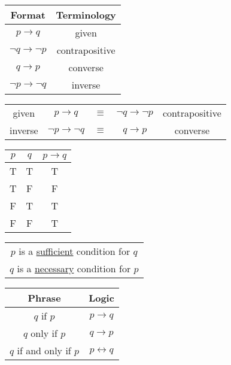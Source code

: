 \begin{center}
  \begin{tabular}{c|c}
    Format                          & Terminology    \\
    \hline
    \(p \rightarrow q\)             & given          \\
    \(\lnot q \rightarrow \lnot p\) & contrapositive \\
    \(q \rightarrow p\)             & converse       \\
    \(\lnot p \rightarrow \lnot q\) & inverse        \\
  \end{tabular}
  \qquad
  \begin{tabular}{ccccc}
    given   & \(p \rightarrow q\)             & \(\equiv\) & \(\lnot q \rightarrow \lnot p\) & contrapositive \\
    inverse & \(\lnot p \rightarrow \lnot q\) & \(\equiv\) & \(q \rightarrow p\)             & converse
  \end{tabular}
\end{center}

\begin{center}
  \begin{tabular}{c|c|c}
    \(p\) & \(q\) & \(p \rightarrow q\) \\
    \hline
    T     & T     & T                   \\
    T     & F     & F                   \\
    F     & T     & T                   \\
    F     & F     & T                   \\
  \end{tabular}
  \quad
  \begin{tabular}{c}
    \(p\) is a \underline{sufficient} condition for \(q\) \\
    \(q\) is a \underline{necessary} condition for \(p\)
  \end{tabular}
  \quad
  \begin{tabular}{c|c}
    Phrase                     & Logic                   \\
    \hline
    \(q\) if \(p\)             & \(p \rightarrow q\)     \\
    \(q\) only if \(p\)        & \(q \rightarrow p\)     \\
    \(q\) if and only if \(p\) & \(p \leftrightarrow q\)
  \end{tabular}
\end{center}

